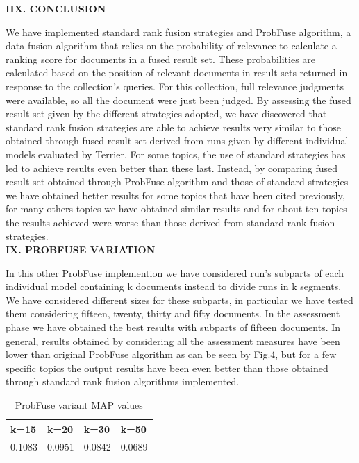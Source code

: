 \documentclass[12pt,journal]{IEEEtran}
\begin{document}
\textbf{IIX. CONCLUSION}

We have implemented standard rank fusion strategies and ProbFuse algorithm, a data fusion algorithm that relies on the probability of relevance to calculate a ranking score for documents in a fused result set.
These probabilities are calculated based on the position of relevant documents in result sets returned in response to the collection’s queries. For this collection, full relevance judgments were available, so all the document were just been judged. 
By assessing the fused result set given by the different strategies adopted, we have discovered that standard rank fusion strategies are able to achieve results very similar to those obtained through fused result set derived from runs given by different individual models evaluated by Terrier. For some topics, the use of standard strategies has led to achieve results even better than these last. Instead, by comparing fused result set obtained through ProbFuse algorithm and those of standard strategies we have obtained better results for some topics that have been cited previously, for many others topics we have obtained similar results and for about ten topics the results achieved were worse than those derived from standard rank fusion strategies. \\

\textbf{IX.	PROBFUSE VARIATION}

In this other ProbFuse implemention we have considered run's subparts of each individual model containing k documents instead to divide runs in k segments. We have considered different sizes for these subparts, in particular we have tested them considering fifteen, twenty, thirty and fifty documents. In the assessment phase we have obtained the best results with subparts of fifteen documents. In general, results obtained by considering all the assessment measures have been lower than original ProbFuse algorithm as can be seen by Fig.4, but for a few specific topics the output results have been even better than those obtained through standard rank fusion algorithms implemented. 

\begin{table}[h!]
\centering
\caption{ProbFuse variant MAP values}
\begin{tabular}{|l|l|l|l|}
\hline
k=15 & k=20 & k=30 & k=50 \\ \hline
0.1083 & 0.0951 & 0.0842 & 0.0689  \\ \hline
\end{tabular}
\end{table}
\end{document}
